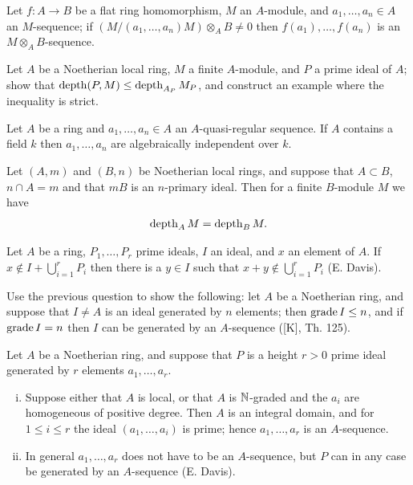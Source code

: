 \begin{exercise}\label{ex:16.4-ex}
Let $f\colon A \to B$ be a flat ring homomorphism, $M$ an $A$-module, and
$a_1, \ldots, a_n \in A$ an $M$-sequence; if $(M/(a_1, \ldots, a_n)M) \otimes_A B \neq 0$ then
$f(a_1), \ldots, f(a_n)$ is an $M \otimes_A B$-sequence.
\end{exercise}

\begin{exercise}\label{ex:16.5-ex}
Let $A$ be a Noetherian local ring, $M$ a finite $A$-module, and $P$ a prime ideal
of $A$; show that $\operatorname{depth}(P, M) \le \operatorname{depth}_{A_P} M_P$, and construct an example
where the inequality is strict.
\end{exercise}

\begin{exercise}\label{ex:16.6-ex}
Let $A$ be a ring and $a_1, \ldots, a_n \in A$ an $A$-quasi-regular sequence. If $A$
contains a field $k$ then $a_1, \ldots, a_n$ are algebraically independent over $k$.
\end{exercise}

\begin{exercise}\label{ex:16.7-ex}
Let $(A, m)$ and $(B, n)$ be Noetherian local rings, and suppose that $A \subset B$,
$n \cap A = m$ and that $mB$ is an $n$-primary ideal. Then for a finite $B$-module
$M$ we have
\[
  \operatorname{depth}_A M = \operatorname{depth}_B M.
\]
\end{exercise}

\begin{exercise}\label{ex:16.8-ex}
Let $A$ be a ring, $P_1, \ldots, P_r$ prime ideals, $I$ an ideal, and $x$ an element of $A$. If
$x \notin I + \bigcup_{i=1}^{r} P_i$ then there is a $y \in I$ such that $x + y \notin \bigcup_{i=1}^{r} P_i$
(E. Davis).
\end{exercise}

\begin{exercise}\label{ex:16.9-ex}
Use the previous question to show the following: let $A$ be a Noetherian
ring, and suppose that $I \neq A$ is an ideal generated by $n$ elements; then
$\operatorname{grade} I \le n$, and if $\operatorname{grade} I = n$ then $I$ can be generated by an $A$-sequence
([K], Th. 125).
\end{exercise}

\begin{exercise}\label{ex:16.10-ex}
Let $A$ be a Noetherian ring, and suppose that $P$ is a height $r > 0$ prime
ideal generated by $r$ elements $a_1, \ldots, a_r$.
\begin{enumerate}[(i)]
  \item Suppose either that $A$ is local, or that $A$ is $\mathbb{N}$-graded and the $a_i$ are
        homogeneous of positive degree. Then $A$ is an integral domain, and for
        $1 \le i \le r$ the ideal $(a_1, \ldots, a_i)$ is prime; hence $a_1, \ldots, a_r$ is an $A$-sequence.
  \item In general $a_1, \ldots, a_r$ does not have to be an $A$-sequence, but $P$ can in
        any case be generated by an $A$-sequence (E. Davis).
\end{enumerate}
\end{exercise}
